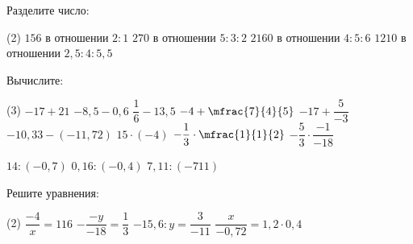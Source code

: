 \begin{homework}[number=1]
	\begin{listofex}
		\item Разделите число:
		\begin{tasks}(2)
			\task \( 156 \) в отношении \( 2:1 \)
			\task \( 270 \) в отношении \( 5:3:2 \)
			\task \( 2160 \) в отношении \( 4:5:6 \)
			\task \( 1210 \) в отношении \( 2,5:4:5,5 \)
		\end{tasks}
		\item Вычислите:
		\begin{tasks}(3)
			\task \( -17 + 21 \)
			\task \( -8,5 - 0,6 \)
			\task \( \dfrac{1}{6} - 13,5 \)
			\task \( -4 + \mfrac{7}{4}{5} \)
			\task \( -17 + \dfrac{5}{-3} \)
			\task \( -10,33 - (-11,72) \)
			\task \( 15 \cdot (-4) \)
			\task \( -\dfrac{1}{3} \cdot \mfrac{1}{1}{2} \)
			\task \( -\dfrac{5}{3}\cdot \dfrac{-1}{-18} \)
			
			\task \( 14 : (-0,7) \)
			\task \( 0,16 : (-0,4) \)
			\task \( 7,11 : (-711) \)
		\end{tasks}
		\item Решите уравнения:
		\begin{tasks}(2)
			\task \( \dfrac{-4}{x}=116 \)
			\task \( -\dfrac{-y}{-18}=\dfrac{1}{3} \)
			\task \( -15,6:y=\dfrac{3}{-11} \)
			\task \( \dfrac{x}{-0,72}=1,2 \cdot 0,4 \)
		\end{tasks}
	\end{listofex}
\end{homework}

